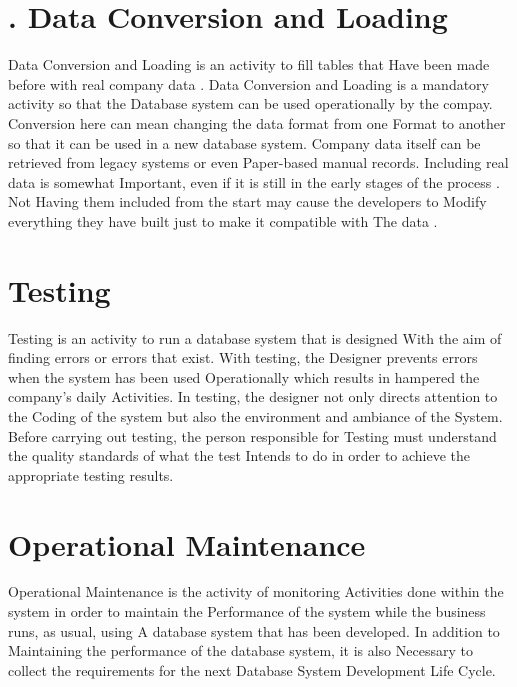 \documentclass[12pt,a4paper]{article}
\begin{document}
\section*{. Data Conversion and Loading}Data Conversion and Loading is an activity to fill tables that Have been made before with real company data . Data 
Conversion and Loading is a mandatory activity so that the Database system can be used operationally by the compay. Conversion here can mean changing the data format from one Format to another so that it can be used in a new database system. 
Company data itself can be retrieved from legacy systems or even Paper-based manual records. Including real data is somewhat Important, even if it is still in the early stages of the process
. Not Having them included from the start may cause the developers to Modify everything they have built just to make it compatible with The data .
\section*{Testing}Testing is an activity to run a database system that is designed With the aim of finding errors or errors that exist. With testing, the Designer prevents errors when the system has been used Operationally which results in hampered the company’s daily Activities. In testing, the designer not only directs attention to the Coding of the system but also the environment and ambiance of the System. 
Before carrying out testing, the person responsible for Testing must understand the quality standards of what the test Intends to do in order to achieve the appropriate testing results.
\section*{Operational Maintenance}Operational Maintenance is the activity of monitoring Activities done within the system in order to maintain the Performance of the system while the business runs, as usual, using A database system that has been developed. In addition to Maintaining the performance of the database system, it is also Necessary to collect the requirements for the next Database System Development Life Cycle.
\end{document}
